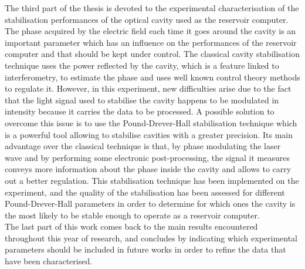 The third part of the thesis is devoted to the experimental characterisation of the stabilisation performances of the optical cavity used as the reservoir computer. The phase acquired by the electric field each time it goes around the cavity is an important parameter which has an influence on the performances of the reservoir computer and that should be kept under control. The classical cavity stabilisation technique uses the power reflected by the cavity, which is a feature linked to interferometry, to estimate the phase and uses well known control theory methods to regulate it. However, in this experiment, new difficulties arise due to the fact that the light signal used to stabilise the cavity happens to be modulated in intensity because it carries the data to be processed. A possible solution to overcome this issue is to use the Pound-Drever-Hall stabilisation technique which is a powerful tool allowing to stabilise cavities with a greater precision. Its main advantage over the classical technique is that, by phase modulating the laser wave and by performing some electronic post-processing, the signal it measures conveys more information about the phase inside the cavity and allows to carry out a better regulation. This stabilisation technique has been implemented on the experiment, and the quality of the stabilisation has been assessed for different Pound-Drever-Hall parameters in order to determine for which ones the cavity is the most likely to be stable enough to operate as a reservoir computer.\\


The last part of this work comes back to the main results encountered throughout this year of research, and concludes by indicating which experimental parameters should be included in future works in order to refine the data that have been characterised.







